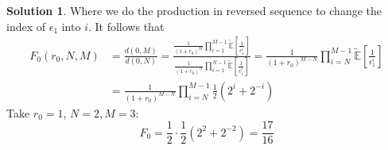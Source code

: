 \documentclass[a4paper, 10pt]{article}
\theoremstyle{definition}
\theoremstyle{hSol}
\newtheorem*{solution}{Solution}
\begin{document}
\begin{solution}
Where we do the production in reversed sequence to change the index of $\epsilon_1$ into $i$. It follows that
\begin{equation}
  \begin{split}
    F_0(r_0, N,M) &= \frac{d(0,M)}{d(0,N)} = \frac{\frac{1}{(1+r_0)^M} \prod_{i=1}^{M-1}\tilde{\mathbb{E}}\left[\frac{1}{\epsilon_1^{i}}\right]}{\frac{1}{(1+r_0)^N} \prod_{i=1}^{N-1}\tilde{\mathbb{E}}\left[\frac{1}{\epsilon_1^{i}}\right]} = \frac{1}{(1+r_0)^{M-N}} \prod_{i=N}^{M-1}\tilde{\mathbb{E}}\left[\frac{1}{\epsilon_1^{i}}\right] \\
    &= \frac{1}{(1+r_0)^{M-N}} \prod_{i=N}^{M-1} \frac{1}{2}\left(2^i + 2^{-i}\right)
  \end{split}
\end{equation}
Take $r_0=1$, $N=2, M=3$:
$$
F_0 = \frac{1}{2} \cdot \frac{1}{2}\left(2^2 + 2^{-2}\right) = \frac{17}{16}
$$
\end{solution}
\end{document}
